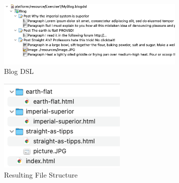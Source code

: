 \documentclass{article}
\begin{document}
	
	\begin{figure}[bth]
		\centering
		\begin{subfigure}[c]{\linewidth}
				\centering
			\includegraphics[width=\linewidth]{figures/blog-dsl}
			\caption{Blog DSL}
			\label{fig:blogDSL}
		\end{subfigure}
		\begin{subfigure}[c]{0.5\linewidth}
					\centering
			\includegraphics[width=\linewidth]{figures/file-structure}
			\caption{Resulting File Structure}
			\label{fig:fileStructure}
		\end{subfigure}
		\begin{subfigure}[c]{0.45\linewidth}
					\centering

\end{subfigure}
\end{figure}
\end{document}
